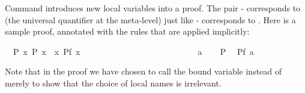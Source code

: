 \begin{isabellebody}
\begin{isamarkuptext}
Command  introduces new local variables into a
proof. The pair - corresponds to \isa{{\isasymAnd}}
(the universal quantifier at the
meta-level) just like - corresponds to
\isa{{\isasymLongrightarrow}}. Here is a sample proof, annotated with the rules that are
applied implicitly:%
\end{isamarkuptext}%
\isamarkuptrue%
\isamarkupfalse%
\ \ P{\isacharcolon}\ {\isachardoublequoteopen}{\isasymforall}x{\isachardot}\ P\ x{\isachardoublequoteclose}\ \ {\isachardoublequoteopen}{\isasymforall}x{\isachardot}\ P{\isacharparenleft}f\ x{\isacharparenright}{\isachardoublequoteclose}\isanewline
%
\isadelimproof
%
\endisadelimproof
%
\isatagproof
{}\isamarkupfalse%
\ \ \ \ \ \ \ \ \ \ \ \ \ \ \ \ \ \ \ \ \ \ \ %
\isanewline
\ \ \isamarkupfalse%
\ a\isanewline
\ \ \isamarkupfalse%
\ P\ \isamarkupfalse%
\ {\isachardoublequoteopen}P{\isacharparenleft}f\ a{\isacharparenright}{\isachardoublequoteclose}\ \isacommand{{\isachardot}{\isachardot}}\isamarkupfalse%
\ \ %
\isanewline
{}\isamarkupfalse%
%
\endisatagproof
{\isafoldproof}%
%
\isadelimproof
%
\endisadelimproof
%
\begin{isamarkuptext}%
\noindent Note that in the proof we have chosen to call the bound
variable  instead of  merely to show that the choice of
local names is irrelevant.


\end{isamarkuptext}
\end{isabellebody}
